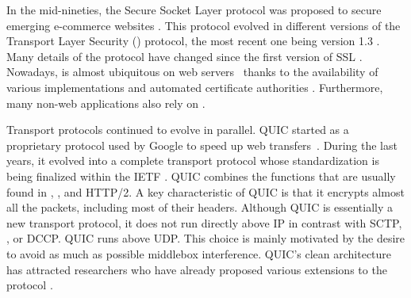 
In the mid-nineties, the Secure Socket Layer protocol was proposed to secure
emerging e-commerce websites \cite{draft-hickman-netscape-ssl}. This protocol
evolved in different versions of the Transport Layer Security (\tls)
protocol, the most recent one being version 1.3 \cite{rfc8446}. Many details
of the \tls protocol have changed since the first version of SSL
\cite{kotzias2018coming}. Nowadays, \tls is almost ubiquitous on web servers~\cite{holz2019era}
thanks to the availability of various \tls implementations and
automated certificate authorities \cite{aas2019let}. Furthermore,
many non-web applications also rely on \tls \cite{anderson2019tls}.


Transport protocols continued to evolve in parallel. QUIC started as
a proprietary protocol used by Google to speed up web
transfers~\cite{roskind2013quic,langley2017quic}. During
the last years, it evolved into a complete transport protocol whose
standardization is being finalized within the IETF \cite{draft-ietf-quic-transport}.
QUIC combines the
functions that are usually found in \tcp, \tls, and HTTP/2. A key characteristic
of QUIC is that it encrypts almost all the packets, including
most of their headers.
Although QUIC is essentially a new transport protocol, it does not run
directly above IP in contrast with SCTP, \tcp, or DCCP. QUIC runs above UDP. This
choice is mainly motivated by the desire to avoid as much as possible
middlebox interference. QUIC's clean architecture has attracted researchers
who have already proposed various extensions to the protocol
\cite{de2019pluginizing,viernickel2018multipath,polese2019survey,michel2019quic,draft-huitema-quic-ts,draft-shi-quic-dtp,draft-swett-nwcrg-coding-for-quic}.

